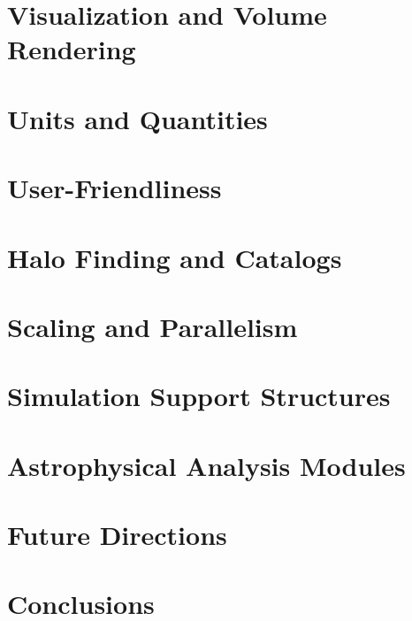 \documentclass{emulateapj}
\begin{document}
\section{Visualization and Volume Rendering}


\section{Units and Quantities}


\section{User-Friendliness}


\section{Halo Finding and Catalogs}


\section{Scaling and Parallelism}


\section{Simulation Support Structures}


\section{Astrophysical Analysis Modules}


\section{Future Directions}


\section{Conclusions}\label{sec:conclusions}


\acknowledgments 



\end{document}
